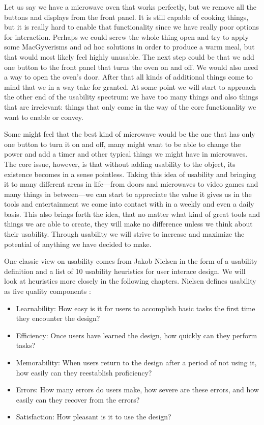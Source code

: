 Let us say we have a microwave oven that works perfectly, but we remove all the buttons and displays from the front panel. It is still capable of cooking things, but it is really hard to enable that functionality since we have really poor options for interaction. Perhaps we could screw the whole thing open and try to apply some MacGyverisms and ad hoc solutions in order to produce a warm meal, but that would most likely feel highly unusable. The next step could be that we add one button to the front panel that turns the oven on and off. We would also need a way to open the oven's door. After that all kinds of additional things come to mind that we in a way take for granted. At some point we will start to approach the other end of the usability spectrum: we have too many things and also things that are irrelevant: things that only come in the way of the core functionality we want to enable or convey. 

Some might feel that the best kind of microwave would be the one that has only one button to turn it on and off, many might want to be able to change the power and add a timer and other typical things we might have in microwaves. The core issue, however, is that without adding usability to the object, its existence becomes in a sense pointless. Taking this idea of usability and bringing it to many different areas in life---from doors and microwaves to video games and many things in between---we can start to appreciate the value it gives us in the tools and entertainment we come into contact with in a weekly and even a daily basis. This also brings forth the idea, that no matter what kind of great tools and things we are able to create, they will make no difference unless we think about their usability. Through usability we will strive to increase and maximize the potential of anything we have decided to make.

One classic view on usability comes from Jakob Nielsen in the form of a usability definition and a list of 10 usability heuristics for user interace design. We will look at heuristics more closely in the following chapters. Nielsen defines usability as five quality components \cite{Nielsen2012}:

\begin{itemize}
	\item Learnability: How easy is it for users to accomplish basic tasks the first time they encounter the design?
	\item Efficiency: Once users have learned the design, how quickly can they perform tasks?
	\item Memorability: When users return to the design after a period of not using it, how easily can they reestablish proficiency?
	\item Errors: How many errors do users make, how severe are these errors, and how easily can they recover from the errors?
	\item Satisfaction: How pleasant is it to use the design?
\end{itemize}

